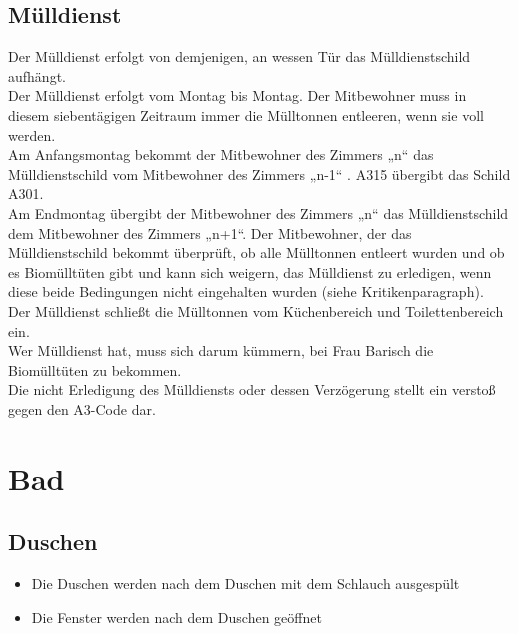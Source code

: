 \documentclass[10pt,a4paper,final]{article}
\begin{document}
\newpage
\subsection{Mülldienst}
Der Mülldienst erfolgt von demjenigen, an wessen Tür das Mülldienstschild aufhängt.\\
Der Mülldienst erfolgt vom Montag bis Montag. Der Mitbewohner muss in diesem siebentägigen Zeitraum immer die Mülltonnen entleeren, wenn sie voll werden.\\
Am Anfangsmontag bekommt der Mitbewohner des Zimmers „n“ das Mülldienstschild vom Mitbewohner des Zimmers „n-1“ . A315 übergibt das Schild A301.\\
Am Endmontag übergibt der Mitbewohner des Zimmers „n“ das Mülldienstschild dem Mitbewohner des Zimmers „n+1“. Der Mitbewohner, der das Mülldienstschild bekommt überprüft, ob alle Mülltonnen entleert wurden und ob es Biomülltüten gibt und kann sich weigern, das Mülldienst zu erledigen, wenn diese beide Bedingungen nicht eingehalten wurden (siehe Kritikenparagraph).\\
Der Mülldienst schließt die Mülltonnen vom Küchenbereich und Toilettenbereich ein.\\
Wer Mülldienst hat, muss sich darum kümmern, bei Frau Barisch die Biomülltüten zu bekommen.\\
Die nicht Erledigung des Mülldiensts oder dessen Verzögerung stellt ein verstoß gegen den A3-Code dar.

\section{Bad}
\subsection{Duschen}
\begin{itemize}
\item Die Duschen werden nach dem Duschen mit dem Schlauch ausgespült
\item Die Fenster werden nach dem Duschen geöffnet
\end{itemize}
\end{document}
